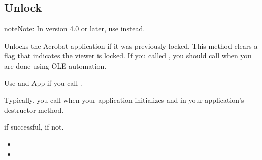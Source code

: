 \documentclass[letterpaper,12pt,english,openany,oneside]{sphinxmanual}
\begin{document}
\subsection{Unlock}
\label{\detokenize{IAC_API_OLE_Objects:unlock}}
\begin{sphinxadmonition}{note}{Note:}
In version 4.0 or later, use   instead.
\end{sphinxadmonition}

Unlocks the Acrobat application if it was previously locked. This method clears a flag that indicates the viewer is locked. If you called   , you should call  when you are done using OLE automation.

Use   and App   if you call  .

Typically, you call   when your application initializes and  in your application’s destructor method.


\begin{sphinxVerbatim}[commandchars=\\\{\}]
 
\end{sphinxVerbatim}


 if successful,  if not.

\label{\detokenize{IAC_API_OLE_Objects:related-methods-26}}
\begin{itemize}
\item {} 
 

\item {} 
 

\end{itemize}
\end{document}

